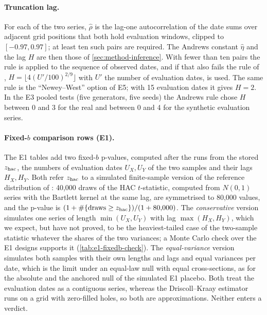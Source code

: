 \paragraph{Truncation lag.}
For each of the two series, $\hat\rho$ is the lag-one autocorrelation of the date sums over
adjacent grid positions that both hold evaluation windows, clipped to $[-0.97,0.97]$; at least
ten such pairs are required. The Andrews constant $\hat\eta$ and the lag $H$ are then those of
\cref{sec:method-inference}. With fewer than ten pairs the rule is applied to the sequence of
observed dates, and if that also fails the rule of \citet{newey1994automatic},
$H=\lfloor4(U'/100)^{2/9}\rfloor$ with $U'$ the number of evaluation dates, is used. The same
rule is the ``Newey--West'' option of E5; with 15 evaluation dates it gives $H=2$. In the E3
pooled \WC{} tests (five generators, five seeds) the Andrews rule chose $H$ between 0 and 3 for
the real and between 0 and 4 for the synthetic evaluation series.

\paragraph{Fixed-\texorpdfstring{$b$}{b} comparison rows (E1).}
The E1 tables add two fixed-$b$ p-values, computed after the runs from the stored $z_{\mathrm{hac}}$, the
numbers of evaluation dates $U_X,U_Y$ of the two samples and their lags $H_X,H_Y$. Both refer
$z_{\mathrm{hac}}$ to a simulated finite-sample version of the reference distribution of
\citet{kiefer_2005_new}: 40{,}000 draws of the HAC $t$-statistic, computed from \iid{} $N(0,1)$
series with the Bartlett kernel at the same lag, are symmetrised to 80{,}000 values, and the
p-value is $(1+\#\{\text{draws}\ge z_{\mathrm{hac}}\})/(1+80{,}000)$. The \emph{conservative} version
simulates one series of length $\min(U_X,U_Y)$ with lag $\max(H_X,H_Y)$, which we expect, but
have not proved, to be the heaviest-tailed case of the two-sample statistic whatever the shares of
the two variances; a Monte Carlo check over the E1 designs supports it
(\cref{tab:e1-fixedb-check}). The
\emph{equal-variance} version simulates both samples with their own lengths and lags and equal
variances per date, which is the limit under an equal-law null with equal cross-sections, as
for the absolute and the anchored null of the simulated E1 placebo. Both treat the evaluation dates as a contiguous series, whereas the
Driscoll--Kraay estimator runs on a grid with zero-filled holes, so both are approximations.
Neither enters a verdict.


